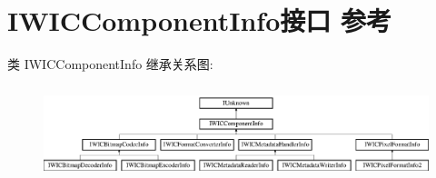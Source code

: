 \hypertarget{interface_i_w_i_c_component_info}{}\section{I\+W\+I\+C\+Component\+Info接口 参考}
\label{interface_i_w_i_c_component_info}
类 I\+W\+I\+C\+Component\+Info 继承关系图\+:\begin{figure}[H]
\begin{center}
\leavevmode
\includegraphics[height=2.731707cm]{interface_i_w_i_c_component_info}
\end{center}
\end{figure}
